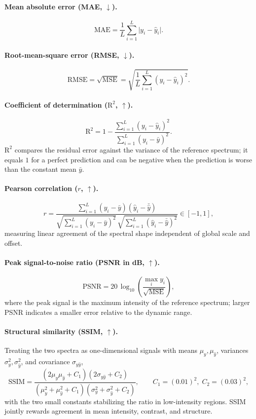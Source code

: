 \documentclass[pdflatex,sn-mathphys-num]{sn-jnl}%
\theoremstyle{thmstyleone}%
\theoremstyle{thmstyletwo}%
\theoremstyle{thmstylethree}%
\begin{document}
\begin{appendices}
\paragraph{Mean absolute error (MAE, $\downarrow$).}
\[
\mathrm{MAE}=\frac{1}{L}\sum_{i=1}^{L}\bigl|y_i-\hat y_i\bigr|.
\]

\paragraph{Root-mean-square error (RMSE, $\downarrow$).}
\[
\mathrm{RMSE}=\sqrt{\mathrm{MSE}}=\sqrt{\frac{1}{L}\sum_{i=1}^{L}(y_i-\hat y_i)^2}.
\]

\paragraph{Coefficient of determination ($\text{R}^2$, $\uparrow$).}
\[
\text{R}^2=1-\frac{\sum_{i=1}^{L}(y_i-\hat y_i)^2}{\sum_{i=1}^{L}(y_i-\bar y)^2}.
\]
$\text{R}^2$ compares the residual error against the variance of the reference spectrum; it equals $1$ for a perfect prediction and can be negative when the prediction is worse than the constant mean $\bar y$.

\paragraph{Pearson correlation ($r$, $\uparrow$).}
\[
r=\frac{\sum_{i=1}^{L}(y_i-\bar y)(\hat y_i-\bar{\hat y})}{\sqrt{\sum_{i=1}^{L}(y_i-\bar y)^2}\,\sqrt{\sum_{i=1}^{L}(\hat y_i-\bar{\hat y})^2}}\in[-1,1],
\]
measuring linear agreement of the spectral shape independent of global scale and offset.

\paragraph{Peak signal-to-noise ratio (PSNR in dB, $\uparrow$).}
\[
\mathrm{PSNR}=20\,\log_{10}\!\left(\frac{\max_i y_i}{\sqrt{\mathrm{MSE}}}\right),
\]
where the peak signal is the maximum intensity of the reference spectrum; larger PSNR indicates a smaller error relative to the dynamic range.

\paragraph{Structural similarity (SSIM, $\uparrow$).}
Treating the two spectra as one-dimensional signals with means $\mu_y,\mu_{\hat y}$, variances $\sigma_y^2,\sigma_{\hat y}^2$, and covariance $\sigma_{y\hat y}$,
\[
\mathrm{SSIM}=\frac{(2\mu_y\mu_{\hat y}+C_1)(2\sigma_{y\hat y}+C_2)}{(\mu_y^2+\mu_{\hat y}^2+C_1)(\sigma_y^2+\sigma_{\hat y}^2+C_2)},
\qquad C_1=(0.01)^2,\; C_2=(0.03)^2,
\]
with the two small constants stabilizing the ratio in low-intensity regions. SSIM jointly rewards agreement in mean intensity, contrast, and structure.


\end{appendices}
\end{document}
